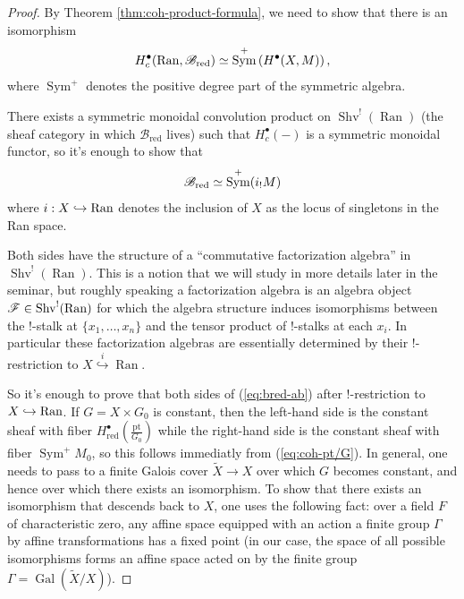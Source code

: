 \documentclass[oneside]{amsart}
\newcommand{\Bred}{\mathcal{B}_\text{red}}
\DeclareMathOperator{\Ran}{Ran}
\newcommand{\red}{_{\mathrm{red}}}
\DeclareMathOperator{\Sym}{Sym}
\DeclareMathOperator{\Shv}{Shv}
\begin{document}
\begin{proof}
	By Theorem \ref{thm:coh-product-formula}, we need to show that there is an isomorphism
	\[
	H_c^{\bullet}(\Ran,\Bred) \isoto \Sym^{+}\left( H^{\bullet}(X,M) \right),
	\] 
    where $\Sym^+$ denotes the positive degree part of the symmetric algebra.
    
	There exists a symmetric monoidal convolution product on $\Shv^{!}(\Ran)$ (the sheaf category in which $\Bred$ lives) such that $H_c^{\bullet}(-)$ is a symmetric monoidal functor, so it's enough to show that
	\begin{equation} \label{eq:bred-ab}
	    \Bred \isoto \Sym^{+}(i_{!}M)
	\end{equation}
	where $i:X\injto \Ran$ denotes the inclusion of $X$ as the locus of singletons in the Ran space.

	Both sides have the structure of a ``commutative factorization algebra'' in $\Shv^{!}(\Ran)$. This is a notion that we will study in more details later in the seminar, but roughly speaking a factorization algebra is an algebra object $\CF\in \Shv^{!}(\Ran)$ for which the algebra structure induces isomorphisms between the $!$-stalk at $\{x_1,\dots,x_n\} $ and the tensor product of $!$-stalks at each $x_i$. In particular these factorization algebras are essentially determined by their $!$-restriction to $X \overset{i}{\hookrightarrow} \Ran$.

	So it's enough to prove that both sides of (\ref{eq:bred-ab}) after $!$-restriction to $X\injto \Ran$. If $G=X\times G_0$ is constant, then the left-hand side is the constant sheaf with fiber $H\red^{\bullet}\left( \frac{\text{pt}}{G_0} \right)$ while the right-hand side is the constant sheaf with fiber $\Sym^{+}M_0$, so this follows immediatly from (\ref{eq:coh-pt/G}). In general, one needs to pass to a finite Galois cover $\widetilde{X} \to X$ over which $G$ becomes constant, and hence over which there exists an isomorphism. To show that there exists an isomorphism that descends back to $X$, one uses the following fact: over a field $F$ of characteristic zero, any affine space equipped with an action a finite group $\Gamma$ by affine transformations has a fixed point (in our case, the space of all possible isomorphisms forms an affine space acted on by the finite group $\Gamma = \operatorname{Gal}(\widetilde{X}/X)$).
\end{proof}
\end{document}
